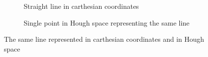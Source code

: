 \documentclass[a4paper, 12pt, twoside]{article}
\begin{document}
\begin{figure}[h]
\centering
\begin{subfigure}[b]{0.4\textwidth}
\fboxsep=0.5mm
\caption{Straight line in carthesian coordinates}
\end{subfigure}
\quad
\begin{subfigure}[b]{0.4\textwidth}
\fboxsep=0.5mm
\caption{Single point in Hough space representing the same line}
\end{subfigure}
\caption{The same line represented in carthesian coordinates and in Hough space}
\label{fig:cathesian_hough}
\end{figure}
\end{document}
